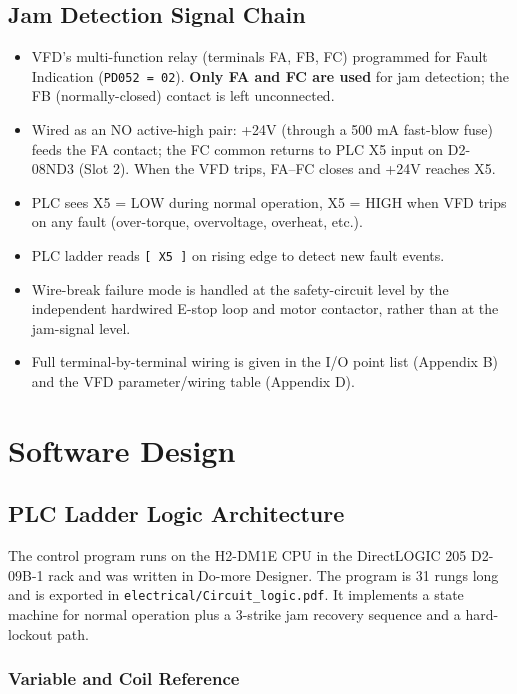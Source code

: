 \documentclass[hidelinks,12pt]{article}
\begin{document}
\subsection{Jam Detection Signal Chain}
\begin{itemize}
    \item VFD's multi-function relay (terminals FA, FB, FC) programmed for Fault Indication (\texttt{PD052 = 02}). \textbf{Only FA and FC are used} for jam detection; the FB (normally-closed) contact is left unconnected.
    \item Wired as an NO active-high pair: +24V (through a 500 mA fast-blow fuse) feeds the FA contact; the FC common returns to PLC X5 input on D2-08ND3 (Slot 2). When the VFD trips, FA--FC closes and +24V reaches X5.
    \item PLC sees X5 = LOW during normal operation, X5 = HIGH when VFD trips on any fault (over-torque, overvoltage, overheat, etc.).
    \item PLC ladder reads \texttt{[ X5 ]} on rising edge to detect new fault events.
    \item Wire-break failure mode is handled at the safety-circuit level by the independent hardwired E-stop loop and motor contactor, rather than at the jam-signal level.
    \item Full terminal-by-terminal wiring is given in the I/O point list (Appendix B) and the VFD parameter/wiring table (Appendix D).
\end{itemize}

\section{Software Design}

\subsection{PLC Ladder Logic Architecture}\label{sec:plcladder}

The control program runs on the H2-DM1E CPU in the DirectLOGIC 205 D2-09B-1 rack
and was written in Do-more Designer. The program is 31 rungs long and is exported
in \texttt{electrical/Circuit\_logic.pdf}. It implements a state machine for normal
operation plus a 3-strike jam recovery sequence and a hard-lockout path.

\subsubsection{Variable and Coil Reference}
\end{document}

